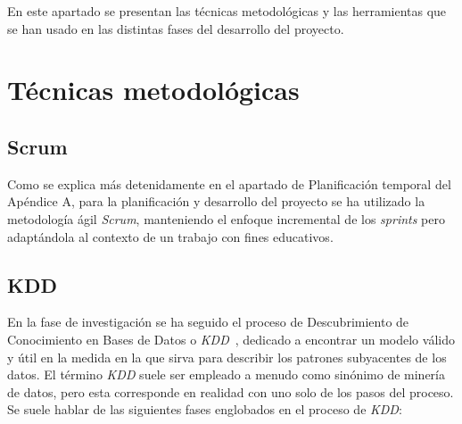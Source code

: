 \label{tecnicas y herramientas}

En este apartado se presentan las técnicas metodológicas y las herramientas que se han usado en las distintas fases del desarrollo del proyecto. 


\section{Técnicas metodológicas}

\subsection{Scrum}

Como se explica más detenidamente en el apartado de Planificación temporal del Apéndice A, para la planificación y desarrollo del proyecto se ha utilizado la metodología ágil \textit{Scrum}, manteniendo el enfoque incremental de los \textit{sprints} pero adaptándola al contexto de un trabajo con fines educativos. 

\subsection{KDD}

En la fase de investigación se ha seguido el proceso de Descubrimiento de Conocimiento en Bases de Datos o \textit{KDD}~\cite{fayyad1996data}, dedicado a encontrar un modelo válido y útil en la medida en la que sirva para describir los patrones subyacentes de los datos. El término \textit{KDD} suele ser empleado a menudo como sinónimo de minería de datos, pero esta corresponde en realidad con uno solo de los pasos del proceso. Se suele hablar de las siguientes fases englobados en el proceso de \textit{KDD}: 

